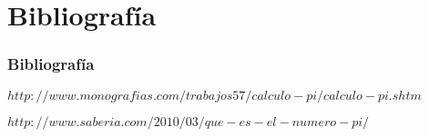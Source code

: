 \documentclass{beamer}
\begin{document}
\section{Bibliografía}
\begin{frame}
  \frametitle{Bibliografía}

  \begin{thebibliography}{10}

    
    \beamertemplatebookbibitems
    {\small $http://www.monografias.com/trabajos57/calculo-pi/calculo-pi.shtm$}
    
    \beamertemplatebookbibitems
    {\small $ http://www.saberia.com/2010/03/que-es-el-numero-pi/$}   

  \end{thebibliography}
\end{frame}

\end{document}
